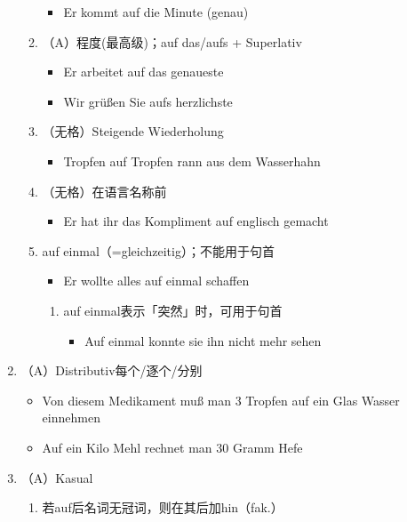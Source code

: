 \documentclass[UTF8]{report}
\begin{document}
\begin{enumerate}
\begin{enumerate}
\begin{itemize}
            \item Er kommt auf die Minute (genau)
        \end{itemize}
        \item （A）程度(最高级)；auf das/aufs + Superlativ
        \begin{itemize}
            \item Er arbeitet auf das genaueste
            \item Wir grüßen Sie aufs herzlichste
        \end{itemize}
        \item （无格）Steigende Wiederholung
        \begin{itemize}
            \item Tropfen auf Tropfen rann aus dem Wasserhahn
        \end{itemize}
        \item （无格）在语言名称前
        \begin{itemize}
            \item Er hat ihr das Kompliment auf englisch gemacht
        \end{itemize}
        \item auf einmal（=gleichzeitig）；不能用于句首
        \begin{itemize}
            \item Er wollte alles auf einmal schaffen
        \end{itemize}
        \begin{enumerate}
            \item auf einmal表示「突然」时，可用于句首
            \begin{itemize}
                \item Auf einmal konnte sie ihn nicht mehr sehen
            \end{itemize}
        \end{enumerate}
    \end{enumerate}
    \item （A）Distributiv每个/逐个/分别
    \begin{itemize}
        \item Von diesem Medikament muß man 3 Tropfen auf ein Glas Wasser einnehmen
        \item Auf ein Kilo Mehl rechnet man 30 Gramm Hefe
    \end{itemize}
    \item （A）Kasual
    \begin{enumerate}
        \item 若auf后名词无冠词，则在其后加hin（fak.）

\end{enumerate}
\end{enumerate}
\end{document}
